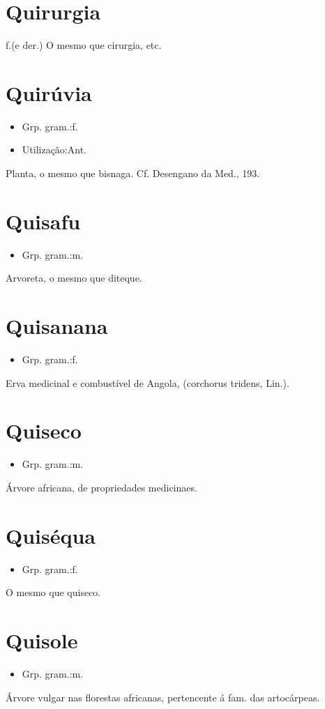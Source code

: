 \section{Quirurgia}
\textunderscore f.\textunderscore  (e der.)
O mesmo que \textunderscore cirurgia\textunderscore , etc.
\section{Quirúvia}
\begin{itemize}
\item {Grp. gram.:f.}
\end{itemize}
\begin{itemize}
\item {Utilização:Ant.}
\end{itemize}
Planta, o mesmo que \textunderscore bisnaga\textunderscore . Cf. \textunderscore Desengano da Med.\textunderscore , 193.
\section{Quisafu}
\begin{itemize}
\item {Grp. gram.:m.}
\end{itemize}
Arvoreta, o mesmo que \textunderscore diteque\textunderscore .
\section{Quisanana}
\begin{itemize}
\item {Grp. gram.:f.}
\end{itemize}
Erva medicinal e combustível de Angola, (\textunderscore corchorus tridens\textunderscore , Lin.).
\section{Quiseco}
\begin{itemize}
\item {Grp. gram.:m.}
\end{itemize}
Árvore africana, de propriedades medicinaes.
\section{Quiséqua}
\begin{itemize}
\item {Grp. gram.:f.}
\end{itemize}
O mesmo que \textunderscore quiseco\textunderscore .
\section{Quisole}
\begin{itemize}
\item {Grp. gram.:m.}
\end{itemize}
Árvore vulgar nas florestas africanas, pertencente á fam. das artocárpeas.
